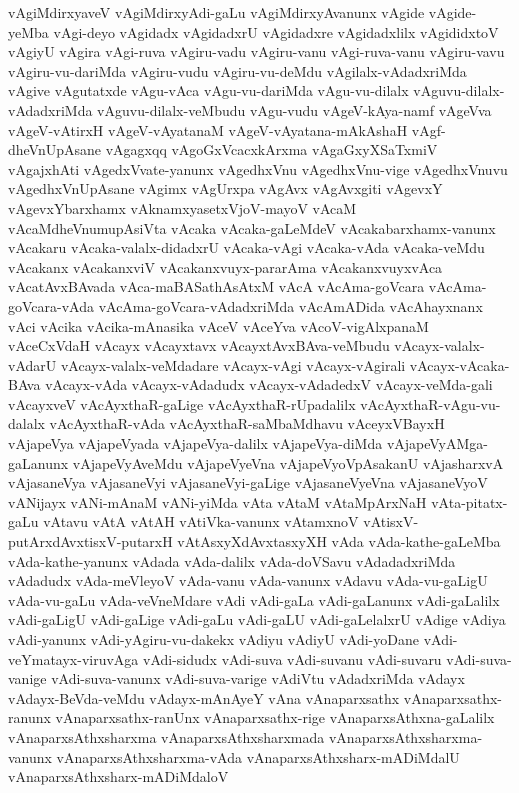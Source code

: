 {vAgiMdirxyaveV
vAgiMdirxyAdi-gaLu
vAgiMdirxyAvanunx
vAgide
vAgide-yeMba
vAgi-deyo
vAgidadx
vAgidadxrU
vAgidadxre
vAgidadxlilx
vAgididxtoV
vAgiyU
vAgira
vAgi-ruva
vAgiru-vadu
vAgiru-vanu
vAgi-ruva-vanu
vAgiru-vavu
vAgiru-vu-dariMda
vAgiru-vudu
vAgiru-vu-deMdu
vAgilalx-vAdadxriMda
vAgive
vAgutatxde
vAgu-vAca
vAgu-vu-dariMda
vAgu-vu-dilalx
vAguvu-dilalx-vAdadxriMda
vAguvu-dilalx-veMbudu
vAgu-vudu
vAgeV-kAya-namf
vAgeVva
vAgeV-vAtirxH
vAgeV-vAyatanaM
vAgeV-vAyatana-mAkAshaH
vAgf-dheVnUpAsane
vAgagxqq
vAgoGxVcacxkArxma
vAgaGxyXSaTxmiV
vAgajxhAti
vAgedxVvate-yanunx
vAgedhxVnu
vAgedhxVnu-vige
vAgedhxVnuvu
vAgedhxVnUpAsane
vAgimx
vAgUrxpa
vAgAvx
vAgAvxgiti
vAgevxY
vAgevxYbarxhamx
vAknamxyasetxVjoV-mayoV
vAcaM
vAcaMdheVnumupAsiVta
vAcaka
vAcaka-gaLeMdeV
vAcakabarxhamx-vanunx
vAcakaru
vAcaka-valalx-didadxrU
vAcaka-vAgi
vAcaka-vAda
vAcaka-veMdu
vAcakanx
vAcakanxviV
vAcakanxvuyx-pararAma
vAcakanxvuyxvAca
vAcatAvxBAvada
vAca-maBASathAsAtxM
vAcA
vAcAma-goVcara
vAcAma-goVcara-vAda
vAcAma-goVcara-vAdadxriMda
vAcAmADida
vAcAhayxnanx
vAci
vAcika
vAcika-mAnasika
vAceV
vAceYva
vAcoV-vigAlxpanaM
vAceCxVdaH
vAcayx
vAcayxtavx
vAcayxtAvxBAva-veMbudu
vAcayx-valalx-vAdarU
vAcayx-valalx-veMdadare
vAcayx-vAgi
vAcayx-vAgirali
vAcayx-vAcaka-BAva
vAcayx-vAda
vAcayx-vAdadudx
vAcayx-vAdadedxV
vAcayx-veMda-gali
vAcayxveV
vAcAyxthaR-gaLige
vAcAyxthaR-rUpadalilx
vAcAyxthaR-vAgu-vu-dalalx
vAcAyxthaR-vAda
vAcAyxthaR-saMbaMdhavu
vAceyxVBayxH
vAjapeVya
vAjapeVyada
vAjapeVya-dalilx
vAjapeVya-diMda
vAjapeVyAMga-gaLanunx
vAjapeVyAveMdu
vAjapeVyeVna
vAjapeVyoVpAsakanU
vAjasharxvA
vAjasaneVya
vAjasaneVyi
vAjasaneVyi-gaLige
vAjasaneVyeVna
vAjasaneVyoV
vANijayx
vANi-mAnaM
vANi-yiMda
vAta
vAtaM
vAtaMpArxNaH
vAta-pitatx-gaLu
vAtavu
vAtA
vAtAH
vAtiVka-vanunx
vAtamxnoV
vAtisxV-putArxdAvxtisxV-putarxH
vAtAsxyXdAvxtasxyXH
vAda
vAda-kathe-gaLeMba
vAda-kathe-yanunx
vAdada
vAda-dalilx
vAda-doVSavu
vAdadadxriMda
vAdadudx
vAda-meVleyoV
vAda-vanu
vAda-vanunx
vAdavu
vAda-vu-gaLigU
vAda-vu-gaLu
vAda-veVneMdare
vAdi
vAdi-gaLa
vAdi-gaLanunx
vAdi-gaLalilx
vAdi-gaLigU
vAdi-gaLige
vAdi-gaLu
vAdi-gaLU
vAdi-gaLelalxrU
vAdige
vAdiya
vAdi-yanunx
vAdi-yAgiru-vu-dakekx
vAdiyu
vAdiyU
vAdi-yoDane
vAdi-veYmatayx-viruvAga
vAdi-sidudx
vAdi-suva
vAdi-suvanu
vAdi-suvaru
vAdi-suva-vanige
vAdi-suva-vanunx
vAdi-suva-varige
vAdiVtu
vAdadxriMda
vAdayx
vAdayx-BeVda-veMdu
vAdayx-mAnAyeY
vAna
vAnaparxsathx
vAnaparxsathx-ranunx
vAnaparxsathx-ranUnx
vAnaparxsathx-rige
vAnaparxsAthxna-gaLalilx
vAnaparxsAthxsharxma
vAnaparxsAthxsharxmada
vAnaparxsAthxsharxma-vanunx
vAnaparxsAthxsharxma-vAda
vAnaparxsAthxsharx-mADiMdalU
vAnaparxsAthxsharx-mADiMdaloV
}
